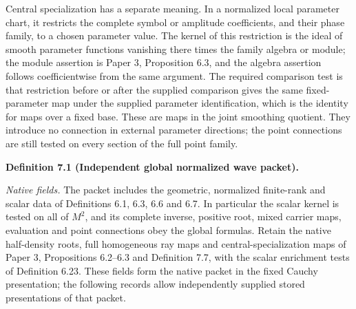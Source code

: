 \documentclass[
  english,
  11pt,
  reqno]{amsart}
\makeatletter
\newcommand{\pandocstatementheading}[1]{%
  \par\if@nobreak\else
    \addpenalty{\@beginparpenalty}%
    \addvspace{.5\baselineskip plus .2\baselineskip minus .2\baselineskip}%
  \fi
  {\normalfont\bfseries #1\par}%
  \nobreak\@afterindenttrue\@afterheading
}
\makeatother
\begin{document}
Central specialization has a separate meaning. In a normalized local
parameter chart, it restricts the complete symbol or amplitude
coefficients, and their phase family, to a chosen parameter value. The
kernel of this restriction is the ideal of smooth parameter functions
vanishing there times the family algebra or module; the module assertion
is Paper 3, Proposition 6.3, and the algebra assertion follows
coefficientwise from the same argument. The required comparison test is
that restriction before or after the supplied comparison gives the same
fixed-parameter map under the supplied parameter identification, which
is the identity for maps over a fixed base. These are maps in the joint
smoothing quotient. They introduce no connection in external parameter
directions; the point connections are still tested on every section of
the full point family.

\pandocstatementheading{\protect{}\label{def:global-independent-normalized-wave-packet}Definition 7.1 (Independent global normalized wave packet).}

\emph{Native fields.} The packet includes the geometric, normalized
finite-rank and scalar data of Definitions 6.1, 6.3, 6.6 and 6.7. In
particular the scalar kernel is tested on all of \(M^2\), and its
complete inverse, positive root, mixed carrier maps, evaluation and
point connections obey the global formulas. Retain the native
half-density roots, full homogeneous ray maps and central-specialization
maps of Paper 3, Propositions 6.2--6.3 and Definition 7.7, with the
scalar enrichment tests of Definition 6.23. These fields form the native
packet in the fixed Cauchy presentation; the following records allow
independently supplied stored presentations of that packet.
\end{document}
